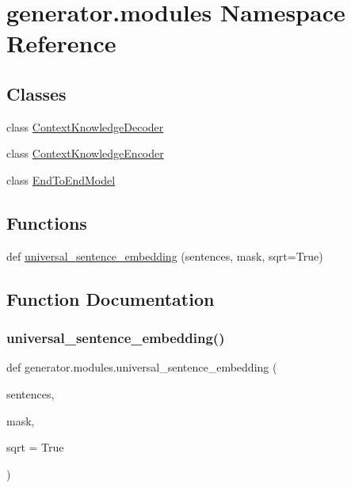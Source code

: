 \hypertarget{namespacegenerator_1_1modules}{}\section{generator.\+modules Namespace Reference}
\label{namespacegenerator_1_1modules}
\subsection*{Classes}
\begin{DoxyCompactItemize}
\item 
class \hyperlink{classgenerator_1_1modules_1_1ContextKnowledgeDecoder}{Context\+Knowledge\+Decoder}
\item 
class \hyperlink{classgenerator_1_1modules_1_1ContextKnowledgeEncoder}{Context\+Knowledge\+Encoder}
\item 
class \hyperlink{classgenerator_1_1modules_1_1EndToEndModel}{End\+To\+End\+Model}
\end{DoxyCompactItemize}
\subsection*{Functions}
\begin{DoxyCompactItemize}
\item 
def \hyperlink{namespacegenerator_1_1modules_ad34b3a76c4bcf6de5e890a2102d3254d}{universal\+\_\+sentence\+\_\+embedding} (sentences, mask, sqrt=True)
\end{DoxyCompactItemize}


\subsection{Function Documentation}
\mbox{\label{namespacegenerator_1_1modules_ad34b3a76c4bcf6de5e890a2102d3254d}} 
\subsubsection{\texorpdfstring{universal\+\_\+sentence\+\_\+embedding()}{universal\_sentence\_embedding()}}
{\footnotesize\ttfamily def generator.\+modules.\+universal\+\_\+sentence\+\_\+embedding (\begin{DoxyParamCaption}\item[{}]{sentences,  }\item[{}]{mask,  }\item[{}]{sqrt = {\ttfamily True} }\end{DoxyParamCaption})}

